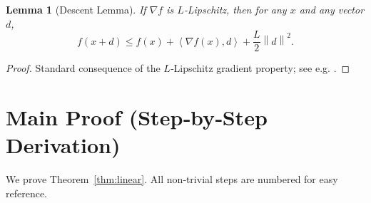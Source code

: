 \documentclass{article}
\newtheorem{lemma}{Lemma}
\newcommand{\norm}[1]{\left\lVert #1\right\rVert}
\newcommand{\ip}[2]{\left\langle #1,#2\right\rangle}
\begin{document}
\begin{lemma}[Descent Lemma]\label{lem:descent}
If $\nabla f$ is $L$‑Lipschitz, then for any $x$ and any vector $d$,
\[
   f(x+d)\le f(x)+\ip{\nabla f(x)}{d}+\frac{L}{2}\norm{d}^{2}.
\]
\end{lemma}
\begin{proof}
Standard consequence of the $L$‑Lipschitz gradient property; see e.g.
\cite[Theorem~2.1.5]{Nesterov2004}.
\end{proof}

\section*{Main Proof (Step‑by‑Step Derivation)}
We prove Theorem~\ref{thm:linear}.  All non‑trivial steps are numbered for easy
reference.
\end{document}
